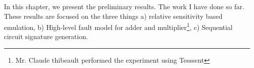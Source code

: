 

In this chapter, we present the preliminary results. The work I have done so far. These results are focused on the three things a) relative sensitivity based emulation, b) High-level fault model for adder and multiplier\footnote{Mr. Claude thibeault performed the experiment using Tesssent }, c) Sequential circuit signature generation.





\label{preliminary}

